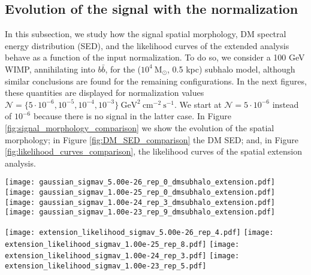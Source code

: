 \documentclass[%
 reprint,
nofootinbib,
 amsmath,amssymb,
 aps,
]{revtex4-2}
\begin{document}
\subsection{Evolution of the signal with the normalization}
\label{app:signal_normalization}
In this subsection, we study how the signal spatial morphology, DM spectral energy distribution (SED), and the likelihood curves of the extended analysis behave as a function of the input normalization. To do so, we consider a 100 GeV WIMP, annihilating into $b\bar{b}$, for the ($\mathrm{10^4~M_{\odot}}$, 0.5 kpc) subhalo model, although similar conclusions are found for the remaining configurations. In the next figures, these quantities are displayed for normalization values $\mathcal{N}=\{5\cdot10
^{-6},10^{-5},10^{-4},10^{-3}\}~\mathrm{GeV^2~cm^{-2}~s^{-1}}$. We start at $\mathcal{N}=5\cdot10^{-6}$ instead of $10^{-6}$ because there is no signal in the latter case. In Figure \ref{fig:signal_morphology_comparison} we show the evolution of the spatial morphology; in Figure \ref{fig:DM_SED_comparison} the DM SED; and, in Figure \ref{fig:likelihood_curves_comparison}, the likelihood curves of the spatial extension analysis.


\begin{figure*}[!ht]
\centering
\texttt{[image: gaussian\_sigmav\_5.00e-26\_rep\_0\_dmsubhalo\_extension.pdf]}
\texttt{[image: gaussian\_sigmav\_1.00e-25\_rep\_0\_dmsubhalo\_extension.pdf]}
\texttt{[image: gaussian\_sigmav\_1.00e-24\_rep\_3\_dmsubhalo\_extension.pdf]}
\texttt{[image: gaussian\_sigmav\_1.00e-23\_rep\_9\_dmsubhalo\_extension.pdf]}
\caption{Spatial morphology of the simulated DM subhalo for $\mathcal{N}=5\cdot10^{-6}$ (top left), $10^{-5}$ (top right), $10^{-4}$ (bottom left), and $10^{-3}$ (bottom right). Green, continuous circle is the best-fit extension, while dashed green circles are the $\pm1\sigma$ uncertainty. The color scale provides the delta log-likelihood values, the black curves being iso-contours for some particular values (note the different z-axis scale in each plot). See text for details of the analysis parameters.}
\label{fig:signal_morphology_comparison}
\end{figure*}


\begin{figure*}[!ht]
\centering
\texttt{[image: extension\_likelihood\_sigmav\_5.00e-26\_rep\_4.pdf]}
\texttt{[image: extension\_likelihood\_sigmav\_1.00e-25\_rep\_8.pdf]}
\texttt{[image: extension\_likelihood\_sigmav\_1.00e-24\_rep\_3.pdf]}
\texttt{[image: extension\_likelihood\_sigmav\_1.00e-23\_rep\_5.pdf]}
\caption{Extension likelihood curves for $\mathcal{N}=5\cdot10^{-6}$ (top left), $10^{-5}$ (top right), $10^{-4}$ (bottom left), and $10^{-3}$ (bottom right). Blue, vertical line is the extension best-fit, while the violet band is the $1\sigma$ uncertainty. See text for details of the analysis parameters.}
\label{fig:likelihood_curves_comparison}
\end{figure*}
\end{document}
